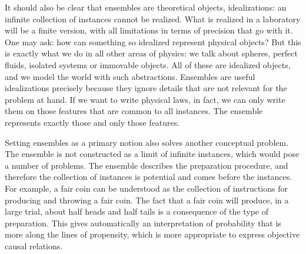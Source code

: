 It should also be clear that ensembles are theoretical objects, idealizations: an infinite collection of instances cannot be realized. What is realized in a laboratory will be a finite version, with all limitations in terms of precision that go with it. One may ask: how can something so idealized represent physical objects? But this is exactly what we do in all other areas of physics: we talk about spheres, perfect fluids, isolated systems or immovable objects. All of these are idealized objects, and we model the world with such abstractions. Ensembles are useful idealizations precisely because they ignore details that are not relevant for the problem at hand. If we want to write physical laws, in fact, we can only write them on those features that are common to all instances. The ensemble represents exactly those and only those features.

Setting ensembles as a primary notion also solves another conceptual problem. The ensemble is not constructed as a limit of infinite instances, which would pose a number of problems. The ensemble describes the preparation procedure, and therefore the collection of instances is potential and comes before the instances. For example, a fair coin can be understood as the collection of instructions for producing and throwing a fair coin. The fact that a fair coin will produce, in a large trial, about half heads and half tails is a consequence of the type of preparation. This gives automatically an interpretation of probability that is more along the lines of propensity, which is more appropriate to express objective causal relations.

